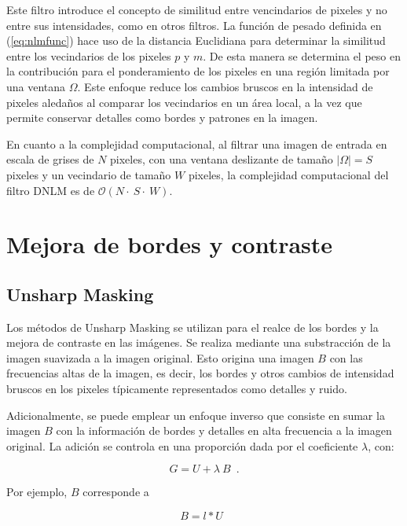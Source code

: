 Este filtro introduce el concepto de similitud entre vencindarios de pixeles y no entre sus intensidades, como en otros filtros. La función de pesado definida en (\ref{eq:nlmfunc}) hace uso de la distancia Euclidiana para determinar la similitud entre los vecindarios de los pixeles $p$ y $m$. 
De esta manera se determina el peso en la contribución para el ponderamiento de los pixeles en una región limitada por una ventana $\Omega$. Este enfoque reduce los cambios bruscos en la intensidad de pixeles aleda\~nos al comparar los vecindarios en un \'area local, a la vez que permite conservar detalles como bordes y patrones en la imagen\cite{calderon2015dewaff}. 


En cuanto a la complejidad computacional, al filtrar una imagen de entrada en escala de grises de $N$ pixeles, con una ventana deslizante de tama\~no $|\Omega| = S$ pixeles y un vecindario de tama\~no $W$ pixeles, la complejidad computacional del filtro DNLM es de $\mathcal{O}(N\cdot~S\cdot~W)$. 



\section{Mejora de bordes y contraste}

\subsection{Unsharp Masking}
\label{ch:marco_usm}

Los métodos de Unsharp Masking se utilizan para el realce de los bordes y la mejora de contraste en las im\'agenes. Se realiza mediante una substracción de la imagen suavizada a la imagen original. Esto origina una imagen $B$ con las frecuencias altas de la imagen, es decir, los bordes y otros cambios de intensidad bruscos en los pixeles típicamente representados como detalles y ruido. 

Adicionalmente, se puede emplear un enfoque inverso que consiste en sumar la imagen $B$ con la información de bordes y detalles en alta frecuencia a la imagen original. La adición se controla en una proporción dada por el coeficiente $\lambda$, con:

\begin{equation}
\label{eq:unsharpmask}
G=U+\lambda~B \enspace .
\end{equation}

Por ejemplo, $B$ corresponde a

\begin{equation}
\label{eq:unsharfilter}
B=l*U \enspace 
\end{equation}

